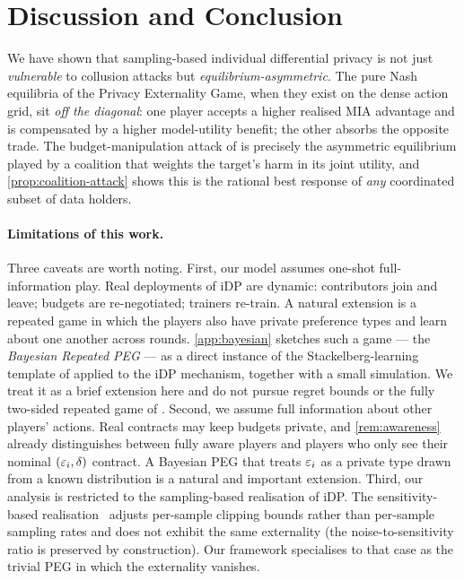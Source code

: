 \section{Discussion and Conclusion}
\label{sec:discussion}

We have shown that sampling-based individual differential privacy is not
just \emph{vulnerable} to collusion attacks but \emph{equilibrium-asymmetric}.
The pure Nash equilibria of the Privacy Externality Game, when they exist on
the dense action grid, sit \emph{off the diagonal}: one player accepts a
higher realised MIA advantage and is compensated by a higher model-utility
benefit; the other absorbs the opposite trade. The budget-manipulation
attack of \citet{kaiser2026your} is precisely the asymmetric equilibrium
played by a coalition that weights the target's harm in its joint utility,
and \cref{prop:coalition-attack} shows this is the rational best response of
\emph{any} coordinated subset of data holders.

\paragraph{Limitations of this work.} Three caveats are worth noting.
First, our model assumes one-shot full-information play. Real
deployments of iDP are dynamic: contributors join and leave; budgets are
re-negotiated; trainers re-train. A natural extension is a repeated game
in which the players also have private preference types and learn about
one another across rounds. \cref{app:bayesian} sketches such a game ---
the \emph{Bayesian Repeated PEG} --- as a direct instance of the
Stackelberg-learning template of \citet{letchford2009learning,
blum2014learning, balcan2015commitment} applied to the iDP mechanism,
together with a small simulation. We treat it as a brief extension here
and do not pursue regret bounds or the fully two-sided repeated game
of \citet{aumann1995repeated}.
Second, we assume full information about other players' actions. Real
contracts may keep budgets private, and \cref{rem:awareness} already
distinguishes between fully aware players and players who only see their
nominal $(\varepsilon_i,\delta)$ contract. A Bayesian PEG that treats $\varepsilon_i$ as
a private type drawn from a known distribution is a natural and important
extension.
Third, our analysis is restricted to the sampling-based realisation of iDP.
The sensitivity-based realisation~\cite{boenisch2023have} adjusts per-sample
clipping bounds rather than per-sample sampling rates and does not exhibit
the same externality (the noise-to-sensitivity ratio is preserved by
construction). Our framework specialises to that case as the trivial PEG in
which the externality vanishes.

